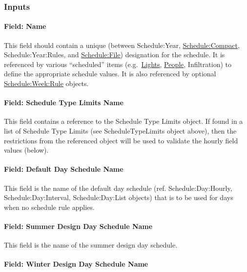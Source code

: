 \subsubsection{Inputs}\label{inputs-scheduleyearrules}

\paragraph{Field: Name}\label{field-name-scheduleyearrules}

This field should contain a unique (between Schedule:Year, \hyperref[schedulecompact]{Schedule:Compact}, Schedule:Year:Rules, and \hyperref[schedulefile]{Schedule:File}) designation for the schedule.
It is referenced by various ``scheduled'' items (e.g.~\hyperref[lights-000]{Lights}, \hyperref[people]{People}, Infiltration) to define the appropriate schedule values.
It is also referenced by optional \hyperref[scheduleweekrule]{Schedule:Week:Rule} objects.

\paragraph{Field: Schedule Type Limits Name}\label{field-schedule-type-limits-name-scheduleyearrules}

This field contains a reference to the Schedule Type Limits object.
If found in a list of Schedule Type Limits (see ScheduleTypeLimits object above), then the restrictions from the referenced object will be used to validate the hourly field values (below).

\paragraph{Field: Default Day Schedule Name}\label{field-default-day-schedule-name-scheduleyearrules}

This field is the name of the default day schedule (ref. Schedule:Day:Hourly, Schedule:Day:Interval, Schedule:Day:List objects) that is to be used for days when no schedule rule applies.

\paragraph{Field: Summer Design Day Schedule Name}\label{field-summer-design-day-schedule-name-scheduleyearrules}

This field is the name of the summer design day schedule.

\paragraph{Field: Winter Design Day Schedule Name}\label{field-winter-design-day-schedule-name-scheduleyearrules}

